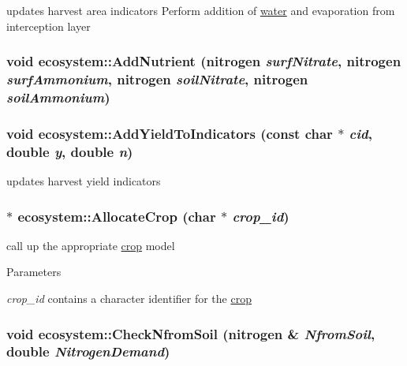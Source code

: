 updates harvest area indicators Perform addition of \hyperlink{classwater}{water} and evaporation from interception layer \hypertarget{classecosystem_a36762ab8f1b4b4239c6bbe00c7214701}{
\subsubsection[{AddNutrient}]{\setlength{\rightskip}{0pt plus 5cm}void ecosystem::AddNutrient ({\bf nitrogen} {\em surfNitrate}, \/  {\bf nitrogen} {\em surfAmmonium}, \/  {\bf nitrogen} {\em soilNitrate}, \/  {\bf nitrogen} {\em soilAmmonium})}}
\label{classecosystem_a36762ab8f1b4b4239c6bbe00c7214701}
\hypertarget{classecosystem_a12089f5ede359af7641a52c456d257a6}{
\subsubsection[{AddYieldToIndicators}]{\setlength{\rightskip}{0pt plus 5cm}void ecosystem::AddYieldToIndicators (const char $\ast$ {\em cid}, \/  double {\em y}, \/  double {\em n})}}
\label{classecosystem_a12089f5ede359af7641a52c456d257a6}


updates harvest yield indicators \hypertarget{classecosystem_a44c464a87c2f3e32ef0d874d53c2635b}{
\subsubsection[{AllocateCrop}]{ $\ast$ ecosystem::AllocateCrop (char $\ast$ {\em crop\_\-id})}}
\label{classecosystem_a44c464a87c2f3e32ef0d874d53c2635b}


call up the appropriate \hyperlink{classcrop}{crop} model 
\begin{DoxyParams}{Parameters}
\item[{\em crop\_\-id}]contains a character identifier for the \hyperlink{classcrop}{crop} \end{DoxyParams}
\hypertarget{classecosystem_aaa5cad8de95fb94e74a33295332efe18}{
\subsubsection[{CheckNfromSoil}]{\setlength{\rightskip}{0pt plus 5cm}void ecosystem::CheckNfromSoil ({\bf nitrogen} \& {\em NfromSoil}, \/  double {\em NitrogenDemand})}}
\label{classecosystem_aaa5cad8de95fb94e74a33295332efe18}


